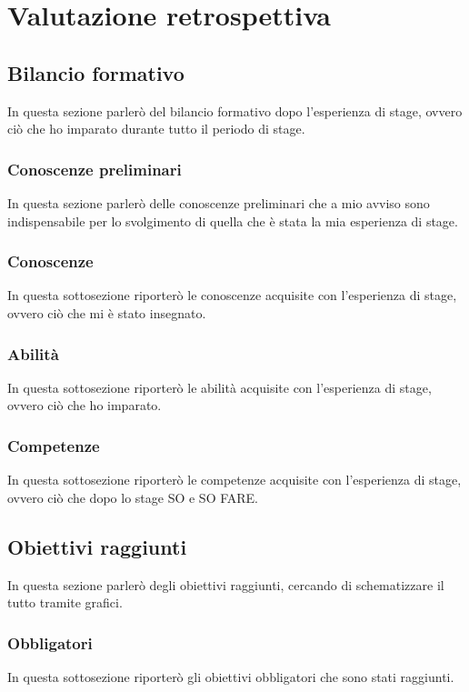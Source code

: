 
\chapter{Valutazione retrospettiva}

\section{Bilancio formativo}
In questa sezione parlerò del bilancio formativo dopo l'esperienza di stage, ovvero ciò che ho imparato durante tutto il periodo di stage.

\subsection{Conoscenze preliminari}
In questa sezione parlerò delle conoscenze preliminari che a mio avviso sono indispensabile per lo svolgimento di quella che è stata la mia esperienza di stage.

\subsection{Conoscenze}
In questa sottosezione riporterò le conoscenze acquisite con l'esperienza di stage, ovvero ciò che mi è stato insegnato.

\subsection{Abilità}
In questa sottosezione riporterò le abilità acquisite con l'esperienza di stage, ovvero ciò che ho imparato.

\subsection{Competenze}
In questa sottosezione riporterò le competenze acquisite con l'esperienza di stage, ovvero ciò che dopo lo stage SO e SO FARE.

\section{Obiettivi raggiunti}
In questa sezione parlerò degli obiettivi raggiunti, cercando di schematizzare il tutto tramite grafici.

\subsection{Obbligatori}
In questa sottosezione riporterò gli obiettivi obbligatori che sono stati raggiunti.

